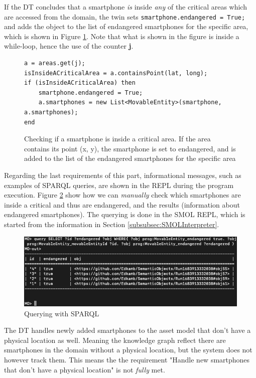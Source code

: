\documentclass{article}
\begin{document}
If the DT concludes that a smartphone \emph{is} inside \emph{any} of the critical areas which are accessed from the domain, the twin sets \verb|smartphone.endangered = True;| and adds the object to the list of endangered smartphones for the specific area, which is shown in Figure \ref{fig:add_endangered}. Note that what is shown in the figure is inside a while-loop, hence the use of the counter \textbf{j}.

\begin{figure}[H]
    \centering
    \begin{Verbatim}[frame=single,breaklines]
a = areas.get(j);
isInsideACriticalArea = a.containsPoint(lat, long);
if (isInsideACriticalArea) then
    smartphone.endangered = True;
    a.smartphones = new List<MovableEntity>(smartphone, a.smartphones);
end
    \end{Verbatim}
    \caption{Checking if a smartphone is inside a critical area. If the area contains its point (x, y), the smartphone is set to endangered, and is added to the list of the endangered smartphones for the specific area}
    \label{fig:add_endangered}
\end{figure}

Regarding the last requirements of this part, informational messages, such as examples of SPARQL queries, are shown in the REPL during the program execution. Figure \ref{fig:sparql_smol} show how we can \emph{manually} check which smartphones are inside a critical and thus are endangered, and the results (information about endangered smartphones). The querying is done in the SMOL REPL, which is started from the information in Section \ref{subsubsec:SMOLInterpreter}.

\begin{figure}[H]
    \centering
    \includegraphics[scale=0.44]{graphics/sparql_smol}
    \caption{Querying with SPARQL}
    \label{fig:sparql_smol}
\end{figure}

The DT handles newly added smartphones to the asset model that don't have a physical location as well. Meaning the knowledge graph reflect there are smartphones in the domain without a physical location, but the system does not however track them. This means the the requirement "Handle new smartphones that don't have a physical location" is not \emph{fully} met.
\end{document}
